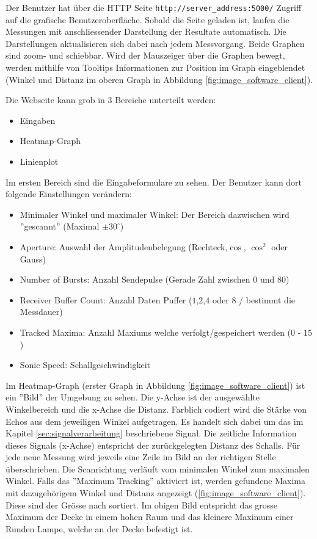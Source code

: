 Der Benutzer hat über die HTTP Seite \texttt{http://server\_address:5000/} Zugriff auf die grafische Benutzeroberfläche. Sobald die Seite geladen ist, laufen die Messungen mit anschliessender Darstellung der Resultate automatisch. Die Darstellungen aktualisieren sich dabei nach jedem Messvorgang. Beide Graphen sind zoom- und schiebbar. Wird der Mauszeiger über die Graphen bewegt, werden mithilfe von Tooltips Informationen zur Position im Graph eingeblendet (Winkel und Distanz im oberen Graph in Abbildung \ref{fig:image_software_client}).

Die Webseite kann grob in 3 Bereiche unterteilt werden:

\begin{itemize}
	\item Eingaben
	\item Heatmap-Graph
	\item Linienplot
\end{itemize}

 Im ersten Bereich sind die Eingabeformulare zu sehen. Der Benutzer kann dort folgende Einstellungen verändern:

\begin{itemize}
	\item Minimaler Winkel und maximaler Winkel: Der Bereich dazwischen wird ''gescannt'' (Maximal $\pm 30^{\circ}$)
	\item Aperture: Auswahl der Amplitudenbelegung (Rechteck,$\cos$, $\cos^{2}$ oder Gauss)
	\item Number of Bursts: Anzahl Sendepulse (Gerade Zahl zwischen $0$ und $80$)
	\item Receiver Buffer Count: Anzahl Daten Puffer ($1$,$2$,$4$ oder $8$ / bestimmt die Messdauer)
	\item Tracked Maxima: Anzahl Maxiums welche verfolgt/gespeichert werden ($0$ - $15$)
	\item Sonic Speed: Schallgeschwindigkeit
\end{itemize}


Im Heatmap-Graph (erster Graph in Abbildung \ref{fig:image_software_client}) ist ein ''Bild'' der Umgebung zu sehen. Die y-Achse ist der ausgewählte Winkelbereich und die x-Achse die Distanz. Farblich codiert wird die Stärke von Echos aus dem jeweiligen Winkel aufgetragen. Es handelt sich dabei um das im Kapitel \ref{sec:signalverarbeitung} beschriebene Signal. Die zeitliche Information dieses Signals (x-Achse) entspricht der zurückgelegten Distanz des Schalls.
Für jede neue Messung wird jeweils eine Zeile im Bild an der richtigen Stelle überschrieben. Die Scanrichtung verläuft vom minimalen Winkel zum maximalen Winkel. Falls das ''Maximum Tracking'' aktiviert ist, werden gefundene Maxima mit dazugehörigem Winkel und Distanz angezeigt (\ref{fig:image_software_client}). Diese sind der Grösse nach sortiert. Im obigen Bild entspricht das grosse Maximum der Decke in einem hohen Raum und das kleinere Maximum einer Runden Lampe, welche an der Decke befestigt ist.

